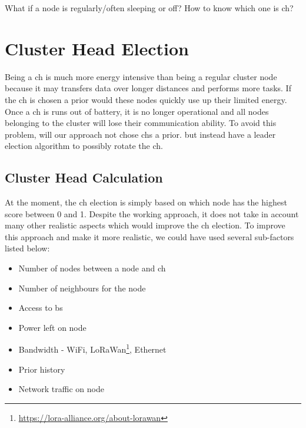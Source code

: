 \documentclass[USenglish]{uit-thesis}
\begin{document}
What if a node is regularly/often sleeping or off? How to know which one is \gls{ch}?



\section{Cluster Head Election}


Being a \gls{ch} is much more energy intensive than being a regular cluster node because it may transfers data over longer distances and performs more tasks. If the \gls{ch} is chosen a prior would these nodes quickly use up their limited energy. Once a \gls{ch} is runs out of battery, it is no longer operational and all nodes belonging to the cluster will lose their communication ability. To avoid this problem, will our approach not chose \gls{ch}s a prior. but instead have a leader election algorithm to possibly rotate the \gls{ch}.


\subsection{Cluster Head Calculation} \label{disc:ch_election}
At the moment, the \gls{ch} election is simply based on which node has the highest score between 0 and 1. Despite the working approach, it does not take in account many other realistic aspects which would improve the \gls{ch} election. To improve this approach and make it more realistic, we could have used several sub-factors listed below:


\begin{itemize}
\item Number of nodes between a node and \gls{ch}
\item Number of neighbours for the node
\item Access to \gls{bs}
\item Power left on node
\item Bandwidth - WiFi, LoRaWan\footnote{\url{https://lora-alliance.org/about-lorawan}}, Ethernet
\item Prior history
\item Network traffic on node
\end{itemize}
\end{document}
